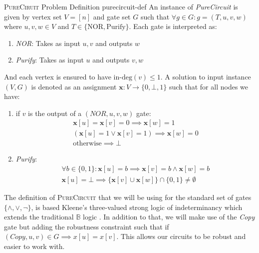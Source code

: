 \begin{definitionbox}{\textsc{PureCiruit} Problem Definition \cite{deligkas_PureCircuitTightInapproximability_2024}}{purecircuit-def}
An instance of \textit{PureCircuit} is given by vertex set $V= [n]$ and gate set $G$ such that
$\forall g \in G: g=(T,u,v,w)$ where $u,v,w \in V$ and $T \in \{\text{NOR}, \text{Purify}\}$.
Each gate is interpreted as:
\begin{enumerate}
    \item \textit{NOR}: Takes as input $u,v$ and outputs $w$
    \item \textit{Purify}: Takes as input $u$ and outputs $v,w$
\end{enumerate}
And each vertex is ensured to have $\text{in-deg}(v) \leq 1$.
A solution to input instance $(V,G)$ is denoted as an assignment $\mathbf{x} : V \to \{0, \bot, 1\}$
such that for all nodes we have:
\begin{enumerate}
    \item if $v$ is the output of a $(\textit{NOR}, u,v,w)$ gate:
       \begin{gather*}
            \mathbf{x}[u] = \mathbf{x}[v] = 0 \implies \mathbf{x}[w] = 1\\
            (\mathbf{x}[u] =1 \vee \mathbf{x}[v] =1) \implies \mathbf{x}[w] = 0 \\
            \text{otherwise} \implies \bot
        \end{gather*}

    \item \textit{Purify}: 
       \begin{gather*}
           \forall b \in \{0,1\}: \mathbf{x}[u] = b \implies \mathbf{x}[v] = b \wedge \mathbf{x}[w] =  b\\
           \mathbf{x}[u] = \bot \implies \{\mathbf{x}[v] \cup \mathbf{x}[w] \} \cap \{0,1\} \neq \emptyset
        \end{gather*}
\end{enumerate}
\end{definitionbox}

The definition of \textsc{PureCircuit} that we will be using for the standard set of gates
$\{\wedge, \vee, \neg\}$, is based Kleene's three-valued strong logic of indeterminancy
which extends the traditional $\mathbb{B}$ logic \cite{kleene_IntroductionMetamathematics_2009}.
In addition to that, we will make use of the \textit{Copy} gate but adding the robustness
constraint such that if $(\textit{Copy},u,v) \in G \implies x[u] = x[v]$.
This allows our circuits to be robust and easier to work with.



